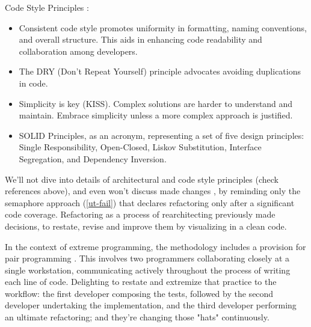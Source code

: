 \noindent Code Style Principles \cite{Mart22}:

\begin{itemize}
  \item Consistent code style promotes uniformity in formatting, naming conventions, and overall structure. 
  This aids in enhancing code readability and collaboration among developers.

  \item The DRY (Don't Repeat Yourself) principle advocates avoiding duplications in code.

  \item Simplicity is key (KISS). Complex solutions are harder to understand and maintain. Embrace simplicity unless a 
  more complex approach is justified.

  \item SOLID Principles, as an acronym, representing a set of five design principles: Single Responsibility, 
  Open-Closed, Liskov Substitution, Interface Segregation, and Dependency Inversion.
\end{itemize}

\noindent We'll not dive into details of architectural and code style principles (check references above), and even 
won't discuss made changes , by reminding only the semaphore approach (\ref{ut-fail}) that declares 
refactoring only after a significant code coverage. Refactoring as a process of rearchitecting \cite{Chec23} previously
made decisions, to restate, revise and improve them by visualizing in a clean code. 

In the context of extreme programming, the methodology includes a provision for pair programming \cite{Ligu19}. This 
involves two programmers collaborating closely at a single workstation, communicating actively throughout the process 
of writing each line of code. Delighting to restate and extremize that practice to the workflow: the first developer 
composing the tests, followed by the second developer undertaking the implementation, and the third developer 
performing an ultimate refactoring; and they're changing those "hats" \cite{Bono17} continuously.

